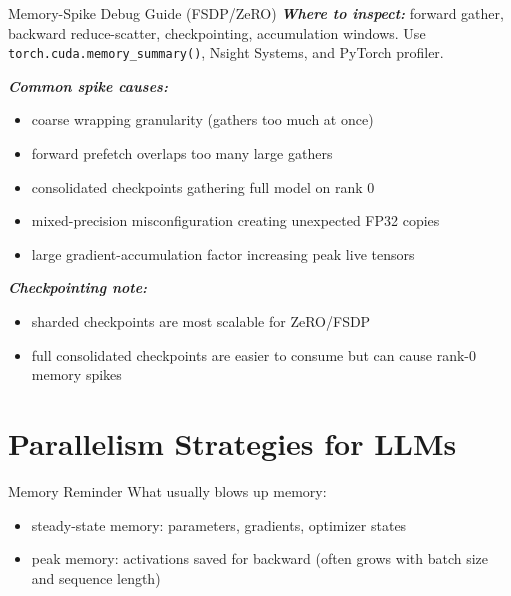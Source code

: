 \documentclass[12pt]{article}
\let\origtextbf\textbf
\renewcommand{\textbf}[1]{\origtextbf{\textit{#1}}}
\begin{document}
\begin{bluebox}{Memory-Spike Debug Guide (FSDP/ZeRO)}
\textbf{Where to inspect:} forward gather, backward reduce-scatter, checkpointing, accumulation windows.  
Use \texttt{torch.cuda.memory\_summary()}, Nsight Systems, and PyTorch profiler.

\textbf{Common spike causes:}
\begin{itemize}
\item coarse wrapping granularity (gathers too much at once)
\item forward prefetch overlaps too many large gathers
\item consolidated checkpoints gathering full model on rank 0
\item mixed-precision misconfiguration creating unexpected FP32 copies
\item large gradient-accumulation factor increasing peak live tensors
\end{itemize}

\textbf{Checkpointing note:}
\begin{itemize}
\item sharded checkpoints are most scalable for ZeRO/FSDP
\item full consolidated checkpoints are easier to consume but can cause rank-0 memory spikes
\end{itemize}
\end{bluebox}

\vspace{2cm}

\section{Parallelism Strategies for LLMs}
\begin{bluebox}{Memory Reminder}
What usually blows up memory:
\begin{itemize}
\item steady-state memory: parameters, gradients, optimizer states
\item peak memory: activations saved for backward (often grows with batch size and sequence length)
\end{itemize}
\end{bluebox}
\end{document}
